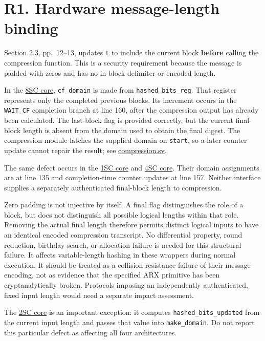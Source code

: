 \documentclass[
  english,
  11pt,
  a4paper,
]{article}
\begin{document}

\section{R1. Hardware message-length
binding}\label{r1.-hardware-message-length-binding}

Section 2.3, pp.~12--13, updates \texttt{t} to include the current block
\textbf{before} calling the compression function. This is a security
requirement because the message is padded with zeros and has no in-block
delimiter or encoded length.

In the \href{data/SOURCES.md\#source-2}{8SC core}, \texttt{cf\_domain}
is made from \texttt{hashed\_bits\_reg}. That register represents only
the completed previous blocks. Its increment occurs in the
\texttt{WAIT\_CF} completion branch at line 160, after the compression
output has already been calculated. The last-block flag is provided
correctly, but the current final-block length is absent from the domain
used to obtain the final digest. The compression module latches the
supplied domain on \texttt{start}, so a later counter update cannot
repair the result; see \href{data/SOURCES.md\#source-3}{compression.sv}.

The same defect occurs in the \href{data/SOURCES.md\#source-4}{1SC core}
and \href{data/SOURCES.md\#source-5}{4SC core}. Their domain assignments
are at line 135 and completion-time counter updates at line 157. Neither
interface supplies a separately authenticated final-block length to
compression.

Zero padding is not injective by itself. A final flag distinguishes the
role of a block, but does not distinguish all possible logical lengths
within that role. Removing the actual final length therefore permits
distinct logical inputs to have an identical encoded compression
transcript. No differential property, round reduction, birthday search,
or allocation failure is needed for this structural failure. It affects
variable-length hashing in these wrappers during normal execution. It
should be treated as a collision-resistance failure of their message
encoding, not as evidence that the specified ARX primitive has been
cryptanalytically broken. Protocols imposing an independently
authenticated, fixed input length would need a separate impact
assessment.

The \href{data/SOURCES.md\#source-6}{2SC core} is an important
exception: it computes \texttt{hashed\_bits\_updated} from the current
input length and passes that value into \texttt{make\_domain}. Do not
report this particular defect as affecting all four architectures.
\end{document}
